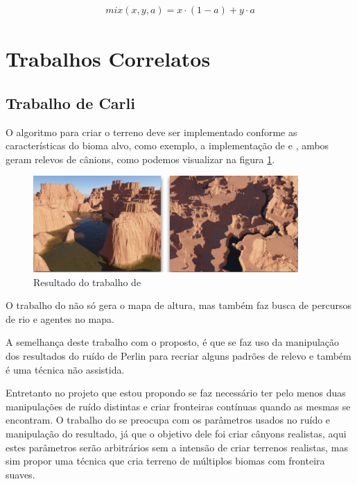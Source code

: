 \begin{equation}\label{eq:mixfunc}
  \begin{split}
    mix(x, y, a) = x \cdot (1 - a) + y \cdot a
  \end{split}
\end{equation}

\section{Trabalhos Correlatos}
\subsection{Trabalho de Carli}
O algoritmo para criar o terreno deve ser implementado conforme as
características do bioma alvo, como exemplo, a implementação de 
\cite{gabrielle2016canion} e \cite{carli2012canion}, ambos geram relevos de
cânions, como podemos visualizar na figura \ref{fig:carli2012result}.
\begin{figure}[H]
    \centering
    \includegraphics[width=0.9\textwidth]{figuras/carli2012result.png}
    \caption{Resultado do trabalho de \cite{carli2012canion}}
    \label{fig:carli2012result}
\end{figure}

O trabalho do \cite{carli2012canion} não só gera o mapa de altura, mas também
faz busca de percursos de rio e agentes no mapa.

A semelhança deste 
trabalho com o proposto, é que se faz uso da manipulação dos resultados do ruído
de Perlin para recriar alguns padrões de relevo e também é uma técnica não assistida.


Entretanto no projeto que 
estou propondo se faz necessário ter pelo menos duas manipulações de ruído distintas
e criar fronteiras contínuas quando as mesmas se encontram. O trabalho 
do \cite{carli2012canion} se preocupa com os parâmetros usados no ruído e manipulação do
resultado, já que o objetivo dele foi criar cânyons realistas, aqui estes parâmetros serão arbitrários
sem a intensão de criar terrenos realistas, mas sim propor uma técnica que cria terreno de múltiplos biomas com fronteira suaves.

